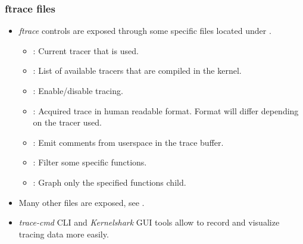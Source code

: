 \begin{frame}
  \frametitle{ftrace files}
  \begin{itemize}
    \item {\em ftrace} controls are exposed through some specific files located under
          .
    \begin{itemize}
      \item {}: Current tracer that is used.
      \item {}: List of available tracers that are
            compiled in the kernel.
      \item {}: Enable/disable tracing.
      \item {}: Acquired trace in human readable format. Format will
            differ depending on the tracer used.
      \item {}: Emit comments from userspace in the
            trace buffer.
      \item {}: Filter some specific functions.
      \item {}: Graph only the specified functions child.
    \end{itemize}
    \item Many other files are exposed, see .
    \item {\em trace-cmd} CLI and {\em Kernelshark} GUI tools allow to record
          and visualize tracing data more easily.
  \end{itemize}
\end{frame}

